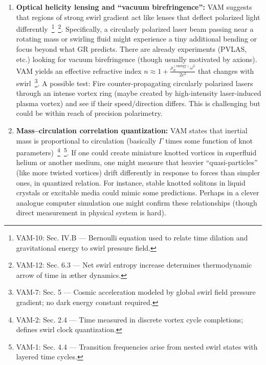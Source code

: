 \documentclass[a4paper,12pt]{article}
\begin{document}
\begin{enumerate}
        \item \textbf{Optical helicity lensing and “vacuum birefringence”:}
        VAM suggests that regions of strong swirl gradient act like lenses that deflect polarized light differently~\footnote{VAM-10: Sec. IV.B — Bernoulli equation used to relate time dilation and gravitational energy to swirl pressure field.}~\footnote{VAM-12: Sec. 6.3 — Net swirl entropy increase determines thermodynamic arrow of time in æther dynamics.}. Specifically, a circularly polarized laser beam passing near a rotating mass or swirling fluid might experience a tiny additional bending or focus beyond what GR predicts. There are already experiments (PVLAS, etc.) looking for vacuum birefringence (though usually motivated by axions). VAM yields an effective refractive index $n \approx 1 + \frac{\rho_{\text{\ae}}^{(\text{energy})}\omega^2}{2c^2}$ that changes with swirl~\footnote{VAM-7: Sec. 5 — Cosmic acceleration modeled by global swirl field pressure gradient; no dark energy constant required.}. A possible test: Fire counter-propagating circularly polarized lasers through an intense vortex ring (maybe created by high-intensity laser-induced plasma vortex) and see if their speed/direction differs. This is challenging but could be within reach of precision polarimetry.

        \item \textbf{Mass–circulation correlation quantization:}
        VAM states that inertial mass is proportional to circulation (basically $\Gamma$ times some function of knot parameters)~\footnote{VAM-2: Sec. 2.4 — Time measured in discrete vortex cycle completions; defines swirl clock quantization.}~\footnote{VAM-1: Sec. 4.4 — Transition frequencies arise from nested swirl states with layered time cycles.}. If one could create miniature knotted vortices in superfluid helium or another medium, one might measure that heavier “quasi-particles” (like more twisted vortices) drift differently in response to forces than simpler ones, in quantized relation. For instance, stable knotted solitons in liquid crystals or excitable media could mimic some predictions. Perhaps in a clever analogue computer simulation one might confirm these relationships (though direct measurement in physical system is hard).


\end{enumerate}
\end{document}
